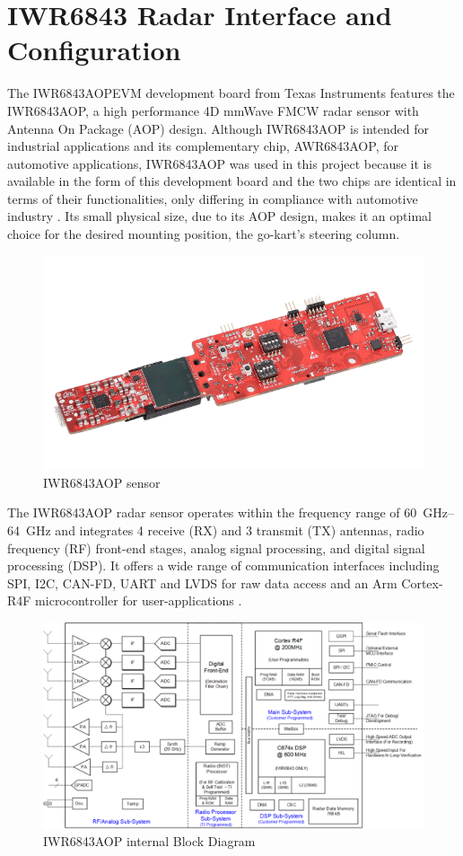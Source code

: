 \newpage

\section{IWR6843 Radar Interface and Configuration}
\label{sec:IWR6843 Radar Interface and Configuration}
The IWR6843AOPEVM development board from Texas Instruments features the IWR6843AOP, a high performance 4D mmWave FMCW radar sensor with Antenna On Package (AOP) design.
Although IWR6843AOP is intended for industrial applications and its complementary chip, AWR6843AOP, for automotive applications, IWR6843AOP was used in this project because it is available in the form of this development board and the two chips are identical in terms of their functionalities, only differing in compliance with automotive  industry \cite{iwr_awr_diff}.
Its small physical size, due to its AOP design, makes it an optimal choice for the desired mounting position, the go-kart's steering column.
\begin{figure}[!htbp]
    \centering
    \includegraphics[width=0.7\linewidth]{images/iwr6843aopevm-angled.png}
    \caption{IWR6843AOP sensor}
    \label{fig:IWR6843AOP sensor}
\end{figure}
\par
The IWR6843AOP radar sensor operates within the frequency range of \SIrange{60}{64}{\giga\hertz} and integrates 4 receive (RX) and 3 transmit (TX) antennas, radio frequency (RF) front-end stages, analog signal processing, and digital signal processing (DSP).
It offers a wide range of communication interfaces including SPI, I2C, CAN-FD, UART and LVDS for raw data access and an Arm Cortex-R4F microcontroller for user-applications \cite{dev_board_page}.
\begin{figure}[!htbp]
    \centering
    \includegraphics[width=1.0\linewidth]{images/blockdiagram.png}
    \caption{IWR6843AOP internal Block Diagram}
    \label{fig:IWR6843AOP_internal}
\end{figure}
